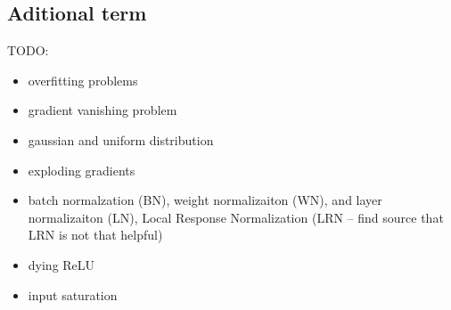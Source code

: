 {
    \color{red}
    \subsection{Aditional term}
    \noindent TODO: \\
    \begin{itemize}
        \item overfitting problems
        \item gradient vanishing problem
        \item gaussian and uniform distribution
        \item exploding gradients
        \item batch normalzation (BN), weight normalizaiton (WN), and layer normalizaiton (LN), Local Response Normalization (LRN -- find source that LRN is not that helpful)
        \item dying ReLU
        \item input saturation
    \end{itemize}
}